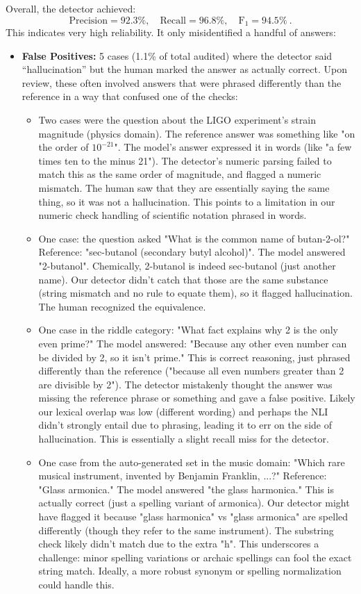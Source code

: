 \documentclass{article}
\begin{document}
Overall, the detector achieved:
\[
\text{Precision} = 92.3\%, \quad \text{Recall} = 96.8\%, \quad \text{F}_1 = 94.5\%~.
\]
This indicates very high reliability. It only misidentified a handful of answers:
\begin{itemize}
    \item \textbf{False Positives:} 5 cases (1.1\% of total audited) where the detector said “hallucination” but the human marked the answer as actually correct. Upon review, these often involved answers that were phrased differently than the reference in a way that confused one of the checks:
    \begin{itemize}
        \item Two cases were the question about the LIGO experiment's strain magnitude (physics domain). The reference answer was something like "on the order of $10^{-21}$". The model's answer expressed it in words (like "a few times ten to the minus 21"). The detector's numeric parsing failed to match this as the same order of magnitude, and flagged a numeric mismatch. The human saw that they are essentially saying the same thing, so it was not a hallucination. This points to a limitation in our numeric check handling of scientific notation phrased in words.
        \item One case: the question asked "What is the common name of butan-2-ol?" Reference: "sec-butanol (secondary butyl alcohol)". The model answered "2-butanol". Chemically, 2-butanol is indeed sec-butanol (just another name). Our detector didn't catch that those are the same substance (string mismatch and no rule to equate them), so it flagged hallucination. The human recognized the equivalence.
        \item One case in the riddle category: "What fact explains why 2 is the only even prime?" The model answered: "Because any other even number can be divided by 2, so it isn't prime." This is correct reasoning, just phrased differently than the reference ("because all even numbers greater than 2 are divisible by 2"). The detector mistakenly thought the answer was missing the reference phrase or something and gave a false positive. Likely our lexical overlap was low (different wording) and perhaps the NLI didn't strongly entail due to phrasing, leading it to err on the side of hallucination. This is essentially a slight recall miss for the detector.
        \item One case from the auto-generated set in the music domain: "Which rare musical instrument, invented by Benjamin Franklin, ...?" Reference: "Glass armonica." The model answered "the glass harmonica." This is actually correct (just a spelling variant of armonica). Our detector might have flagged it because "glass harmonica" vs "glass armonica" are spelled differently (though they refer to the same instrument). The substring check likely didn't match due to the extra "h". This underscores a challenge: minor spelling variations or archaic spellings can fool the exact string match. Ideally, a more robust synonym or spelling normalization could handle this.

\end{itemize}
\end{itemize}
\end{document}
